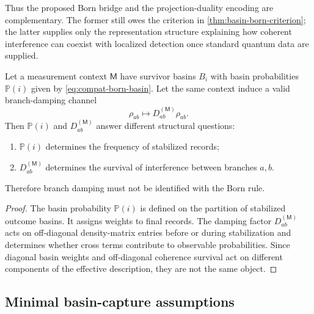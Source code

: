 \documentclass[11pt]{article}
\newcommand{\Meas}{\mathsf M}
\begin{document}
Thus the proposed Born bridge and the projection-duality encoding are complementary. The
former still owes the criterion in \cref{thm:basin-born-criterion}; the latter supplies only
the representation structure explaining how coherent interference can coexist with localized
detection once standard quantum data are supplied.

\begin{proposition}
\label{prop:probability-visibility-separation}
Let a measurement context \(\Meas\) have survivor basins \(B_i\) with basin probabilities
\(\mathbb P(i)\) given by \eqref{eq:compat-born-basin}. Let the same context induce a valid
branch-damping channel
\begin{equation}
  \rho_{ab}\mapsto D_{ab}^{(\Meas)}\rho_{ab}.
\end{equation}
Then \(\mathbb P(i)\) and \(D_{ab}^{(\Meas)}\) answer different structural questions:
\begin{enumerate}[label=(\roman*)]
  \item \(\mathbb P(i)\) determines the frequency of stabilized records;
  \item \(D_{ab}^{(\Meas)}\) determines the survival of interference between branches \(a,b\).
\end{enumerate}
Therefore branch damping must not be identified with the Born rule.
\end{proposition}

\begin{proof}
The basin probability \(\mathbb P(i)\) is defined on the partition of stabilized outcome basins.
It assigns weights to final records. The damping factor \(D_{ab}^{(\Meas)}\) acts on
off-diagonal density-matrix entries before or during stabilization and determines whether
cross terms contribute to observable probabilities. Since diagonal basin weights and
off-diagonal coherence survival act on different components of the effective description,
they are not the same object.
\end{proof}

\subsection{Minimal basin-capture assumptions}
\label{subsec:minimal-basin-capture}
\end{document}
